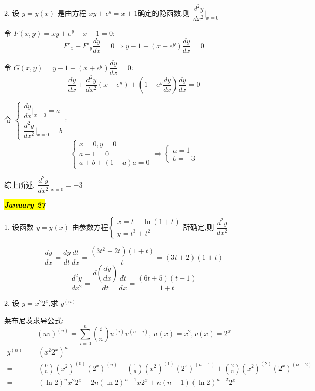 2. 设 $y=y(x)$ 是由方程 $xy+e^{y}=x+1$确定的隐函数,则 $\dfrac{d^{2}y}{dx^{2}}\big|_{x=0}$
\begin{solution}

	令 $F(x,y) = xy+e^{y}-x-1 = 0$:
	$$F'_{x} +F'_{y}\dfrac{dy}{dx} = 0\Rightarrow y-1+(x+e^{y})\dfrac{dy}{dx} = 0$$

	令 $G(x,y) = y-1+(x+e^{y})\dfrac{dy}{dx} = 0$:
	$$\dfrac{dy}{dx}+\dfrac{d^{2}y}{dx^{2}}(x+e^{y})+ (1+e^{y}\dfrac{dy}{dx})\dfrac{dy}{dx}= 0$$

	令 $\begin{cases} \dfrac{dy}{dx}\big|_{x=0} =a\\\dfrac{d^{2}y}{dx^{2}}\big|_{x=0} =b \end{cases}$:
	$$\begin{cases}
		x = 0,y = 0\\
		a - 1 = 0\\
		a + b + (1+a)a = 0
	\end{cases}\Rightarrow \begin{cases} a = 1\\b = -3\end{cases}$$

	综上所述, $\dfrac{d^{2}y}{dx^{2}}\big|_{x=0} = -3$
\end{solution}

\hl{\textbf{\textit{January 27}}}

1. 设函数 $y=y(x)$ 由参数方程$\begin{cases}
	x=t-\ln(1+t)\\y=t^{3}+t^{2}
\end{cases}$所确定,则 $\dfrac{d^{2}y}{dx^{2}}$
\begin{solution}

	$$\dfrac{dy}{dx} = \dfrac{dy}{dt}\dfrac{dt}{dx} = \dfrac{(3t^{2}+2t)(1+t)}{t} = (3t+2)(1+t)$$
	$$\dfrac{d^{2}y}{dx^{2}} = \dfrac{d(\dfrac{dy}{dx})}{dt}\dfrac{dt}{dx}=\dfrac{(6t+5)(t+1)}{1+t}$$
\end{solution}

2. 设 $y=x^{2}2^{x}$,求 $y^{(n)}$
\begin{solution}

	莱布尼茨求导公式: 
	$$(uv)^{(n)} = \sum\limits_{i = 0}^{n}\binom{i}{n}u^{(i)}v^{(n-i)},\ u(x) = x^{2}, v(x) = 2^{x}$$
	\begin{align*}
		y^{(n)} = & (x^{2}2^{x})^{n}\\
		        = & \binom{0}{n}(x^{2})^{(0)}(2^{x})^{(n)}+\binom{1}{n}(x^{2})^{(1)}(2^{x})^{(n-1)}+\binom{2}{n}(x^{2})^{(2)}(2^{x})^{(n-2)}\\
				= & (\ln 2)^{n}x^{2}2^{x} + 2n(\ln 2)^{n-1}x2^{x}+n(n-1)(\ln 2)^{n-2}2^{x}
	\end{align*}
\end{solution}

